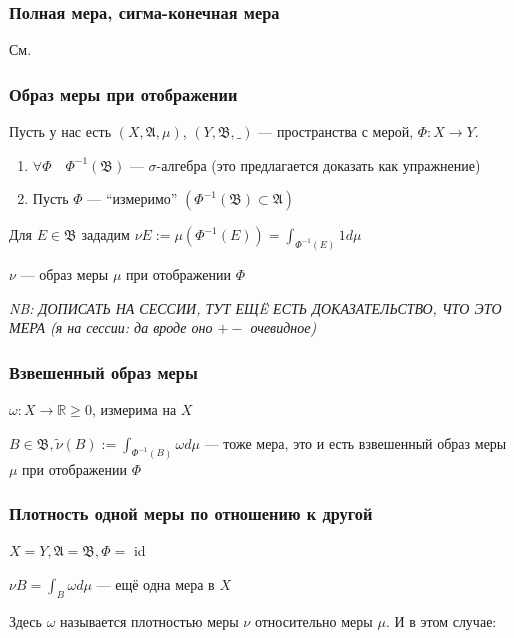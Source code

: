 \documentclass{article}
\begin{document}
\subsubsection{Полная мера, сигма-конечная мера}

См. \href{http://gg.gg/holykpksem3}{\color{blue}{конспект прошлого семестра}}

\subsubsection{Образ меры при отображении}

Пусть у нас есть $(X, \mathfrak{A}, \mu)$, $(Y, \mathfrak{B}, \_ )$ --- пространства с мерой, $\Phi: X \rightarrow Y$.

\begin{enumerate}
    \item $\forall \Phi \quad \Phi^{-1}(\mathfrak{B})$ --- $\sigma$-алгебра (это предлагается доказать как упражнение)
    \item Пусть $\Phi$ --- ``измеримо'' $\left(\Phi^{-1}(\mathfrak{B}) \subset \mathfrak{A}\right)$
\end{enumerate}

Для $E \in \mathfrak{B}$ зададим $\nu E := \mu\left(\Phi^{-1}(E)\right) = \int_{\Phi^{-1}(E)} 1 d \mu$

$\nu$ --- образ меры $\mu$ при отображении $\Phi$

\textit{NB: ДОПИСАТЬ НА СЕССИИ, ТУТ ЕЩË ЕСТЬ ДОКАЗАТЕЛЬСТВО, ЧТО ЭТО МЕРА (я на сессии: да вроде оно $+-$ очевидное)}

\subsubsection{Взвешенный образ меры}

$\omega: X \rightarrow \mathbb{R} \ge 0$, измерима на $X$

$B \in \mathfrak{B}, \tilde{\nu}(B) := \int_{\Phi^{-1}(B)} \omega d\mu$ --- тоже мера, это и есть взвешенный образ меры $\mu$ при отображении $\Phi$

\subsubsection{Плотность одной меры по отношению к другой}

$X = Y, \mathfrak{A} = \mathfrak{B}, \Phi = $ id

$\nu B = \int_{B} \omega d \mu$ --- ещё одна мера в $X$

Здесь $\omega$ называется плотностью меры $\nu$ относительно меры $\mu$. И в этом случае:
\end{document}

